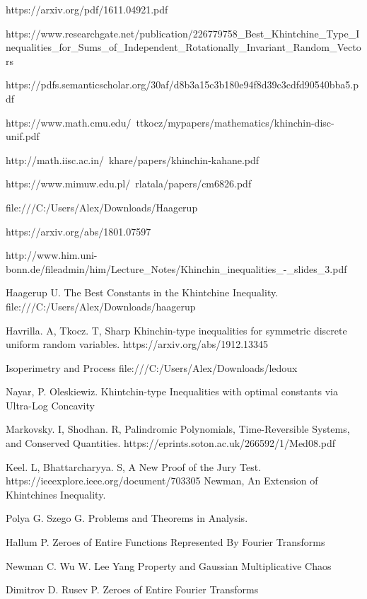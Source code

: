 \documentclass[10pt]{article}
\newcommand{\1}{\textbf{1}}
\theoremstyle{remark}
\theoremstyle{definition}
\begin{document}
\begin{thebibliography}{9}

https://arxiv.org/pdf/1611.04921.pdf

https://www.researchgate.net/publication/226779758_Best_Khintchine_Type_Inequalities_for_Sums_of_Independent_Rotationally_Invariant_Random_Vectors

https://pdfs.semanticscholar.org/30af/d8b3a15c3b180e94f8d39c3cdfd90540bba5.pdf

https://www.math.cmu.edu/~ttkocz/mypapers/mathematics/khinchin-disc-unif.pdf

http://math.iisc.ac.in/~khare/papers/khinchin-kahane.pdf

https://www.mimuw.edu.pl/~rlatala/papers/cm6826.pdf

file:///C:/Users/Alex/Downloads/Haagerup%

https://arxiv.org/abs/1801.07597

http://www.him.uni-bonn.de/fileadmin/him/Lecture_Notes/Khinchin_inequalities_-_slides_3.pdf

 Haagerup U. The Best Constants in the Khintchine Inequality. file:///C:/Users/Alex/Downloads/haagerup%

 Havrilla. A, Tkocz. T, Sharp Khinchin-type inequalities for symmetric discrete uniform random variables. https://arxiv.org/abs/1912.13345

 Isoperimetry and Process file:///C:/Users/Alex/Downloads/ledoux%

 Nayar, P. Oleskiewiz. Khintchin-type Inequalities with optimal constants via Ultra-Log Concavity


 Markovsky. I, Shodhan. R,
Palindromic Polynomials, Time-Reversible Systems, and Conserved Quantities. https://eprints.soton.ac.uk/266592/1/Med08.pdf

 Keel. L, Bhattarcharyya. S,
A New Proof of the Jury Test. https://ieeexplore.ieee.org/document/703305
 Newman, An Extension of Khintchines Inequality. 

 Polya G. Szego G. Problems and Theorems in Analysis. 

 Hallum P. Zeroes of Entire Functions Represented By Fourier Transforms

 Newman C. Wu W. Lee Yang Property and Gaussian Multiplicative Chaos

 Dimitrov D. Rusev P. Zeroes of Entire Fourier Transforms

\end{thebibliography}
\end{document}
